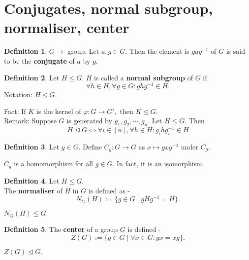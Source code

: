 \documentclass[12 pt, a4paper, toc=graduated, oneside]{article}
\theoremstyle{definition}
\newtheorem{defn}{Definition}
\begin{document}
\section{Conjugates, normal subgroup, normaliser, center}
\begin{defn}
	$G \to$ group. Let $a, g \in G.$ Then the element is $gag^{-1}$ of $G$ is said to be the \textbf{conjugate} of $a$ by $g.$ 
\end{defn}
\begin{defn}
	Let $H \le G.$ $H$ is called a \textbf{normal subgroup} of $G$ if
	\[\forall h \in H, \forall g \in G: ghg^{-1} \in H.\]
	Notation: $H \trianglelefteq G.$
\end{defn}
Fact: If $K$ is the kernel of $\varphi:G\to G',$ then $K \trianglelefteq G.$\\
Remark: Suppose $G$ is generated by $g_1, g_2, \cdots, g_n.$ Let $H \le G.$ Then
\[H \trianglelefteq G \iff \forall i \in [n], \forall h \in H: g_ihg_i^{-1} \in H\]
\begin{defn}
	Let $g\in G.$ Define $C_g:G\to G$ as $x \mapsto gxg^{-1}$ under $C_g.$
\end{defn}
$C_g$ is a homomorphism for all $g \in G.$ In fact, it is an isomorphism.
\begin{defn}
	Let $H \le G.$\\
	The \textbf{normaliser} of $H$ in $G$ is defined as -
	\[N_G(H) := \{g \in G \mid gHg^{-1} = H\}.\]
\end{defn}
$N_G(H) \le G.$
\begin{defn}
	The \textbf{center} of a group $G$ is defined -
	\[Z(G) := \{g \in G \mid \forall x \in G: gx = xg\}.\]
\end{defn}
$Z(G) \trianglelefteq G.$
\end{document}
